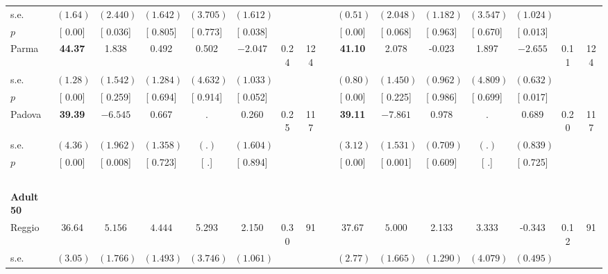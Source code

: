 \begin{longtable}{L{8em} c c c c c c c p{1em} c c c c c c c}
\quad \quad \quad \quad s.e.& $ (     1.64)$ & $ (    2.440)$ & $ (    1.642)$ & $ (    3.705)$ & $ (    1.612)$ & & & & $ (     0.51)$ & $ (    2.048)$ & $ (    1.182)$ & $ (    3.547)$ & $ (    1.024)$ & &  \\*
\quad \quad \quad \quad $ p$ & [     0.00] & [    0.036] & [    0.805] & [    0.773] & [    0.038] & & & & [     0.00] & [    0.068] & [    0.963] & [    0.670] & [    0.013] & &  \\[1em]
\quad \quad \quad Parma& \textbf{    44.37} &     1.838 &     0.492 &     0.502 & $ \mathbf{   -2.047}$ &      0.24 &       124 & & \textbf{    41.10} &     2.078 &    -0.023 &     1.897 & $ \mathbf{   -2.655}$ &      0.11 &       124  \\*
\quad \quad \quad \quad s.e.& $ (     1.28)$ & $ (    1.542)$ & $ (    1.284)$ & $ (    4.632)$ & $ (    1.033)$ & & & & $ (     0.80)$ & $ (    1.450)$ & $ (    0.962)$ & $ (    4.809)$ & $ (    0.632)$ & &  \\*
\quad \quad \quad \quad $ p$ & [     0.00] & [    0.259] & [    0.694] & [    0.914] & [    0.052] & & & & [     0.00] & [    0.225] & [    0.986] & [    0.699] & [    0.017] & &  \\[1em]
\quad \quad \quad Padova& \textbf{    39.39} & $ \mathbf{   -6.545}$ &     0.667 &         . &     0.260 &      0.25 &       117 & & \textbf{    39.11} & $ \mathbf{   -7.861}$ &     0.978 &         . &     0.689 &      0.20 &       117  \\*
\quad \quad \quad \quad s.e.& $ (     4.36)$ & $ (    1.962)$ & $ (    1.358)$ & $ (        .)$ & $ (    1.604)$ & & & & $ (     3.12)$ & $ (    1.531)$ & $ (    0.709)$ & $ (        .)$ & $ (    0.839)$ & &  \\*
\quad \quad \quad \quad $ p$ & [     0.00] & [    0.008] & [    0.723] & [        .] & [    0.894] & & & & [     0.00] & [    0.001] & [    0.609] & [        .] & [    0.725] & &  \\[1em]
~\\[1em]
\quad \quad \textbf{Adult 50} & & & & & & & & & & & & & & & \\* 
\quad \quad \quad Reggio& 36.64 & $ \mathbf{    5.156}$ & $ \mathbf{    4.444}$ &     5.293 &     2.150 &      0.30 &        91 & & 37.67 & $ \mathbf{    5.000}$ &     2.133 &     3.333 &    -0.343 &      0.12 &        91  \\*
\quad \quad \quad \quad s.e.& $ (     3.05)$ & $ (    1.766)$ & $ (    1.493)$ & $ (    3.746)$ & $ (    1.061)$ & & & & $ (     2.77)$ & $ (    1.665)$ & $ (    1.290)$ & $ (    4.079)$ & $ (    0.495)$ & &  \\*

\end{longtable}

